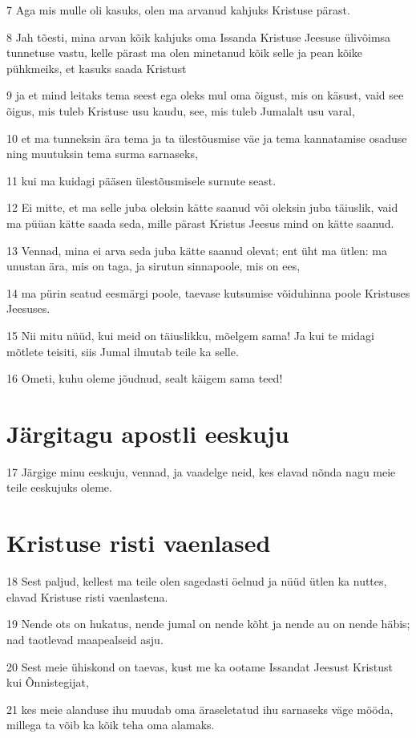 \par 7 Aga mis mulle oli kasuks, olen ma arvanud kahjuks Kristuse pärast.
\par 8 Jah tõesti, mina arvan kõik kahjuks oma Issanda Kristuse Jeesuse ülivõimsa tunnetuse vastu, kelle pärast ma olen minetanud kõik selle ja pean kõike pühkmeiks, et kasuks saada Kristust
\par 9 ja et mind leitaks tema seest ega oleks mul oma õigust, mis on käsust, vaid see õigus, mis tuleb Kristuse usu kaudu, see, mis tuleb Jumalalt usu varal,
\par 10 et ma tunneksin ära tema ja ta ülestõusmise väe ja tema kannatamise osaduse ning muutuksin tema surma sarnaseks,
\par 11 kui ma kuidagi pääsen ülestõusmisele surnute seast.
\par 12 Ei mitte, et ma selle juba oleksin kätte saanud või oleksin juba täiuslik, vaid ma püüan kätte saada seda, mille pärast Kristus Jeesus mind on kätte saanud.
\par 13 Vennad, mina ei arva seda juba kätte saanud olevat; ent üht ma ütlen: ma unustan ära, mis on taga, ja sirutun sinnapoole, mis on ees,
\par 14 ma pürin seatud eesmärgi poole, taevase kutsumise võiduhinna poole Kristuses Jeesuses.
\par 15 Nii mitu nüüd, kui meid on täiuslikku, mõelgem sama! Ja kui te midagi mõtlete teisiti, siis Jumal ilmutab teile ka selle.
\par 16 Ometi, kuhu oleme jõudnud, sealt käigem sama teed!

\section*{Järgitagu apostli eeskuju}

\par 17 Järgige minu eeskuju, vennad, ja vaadelge neid, kes elavad nõnda nagu meie teile eeskujuks oleme.

\section*{Kristuse risti vaenlased}

\par 18 Sest paljud, kellest ma teile olen sagedasti öelnud ja nüüd ütlen ka nuttes, elavad Kristuse risti vaenlastena.
\par 19 Nende ots on hukatus, nende jumal on nende kõht ja nende au on nende häbis; nad taotlevad maapealseid asju.
\par 20 Sest meie ühiskond on taevas, kust me ka ootame Issandat Jeesust Kristust kui Õnnistegijat,
\par 21 kes meie alanduse ihu muudab oma äraseletatud ihu sarnaseks väge mööda, millega ta võib ka kõik teha oma alamaks.


